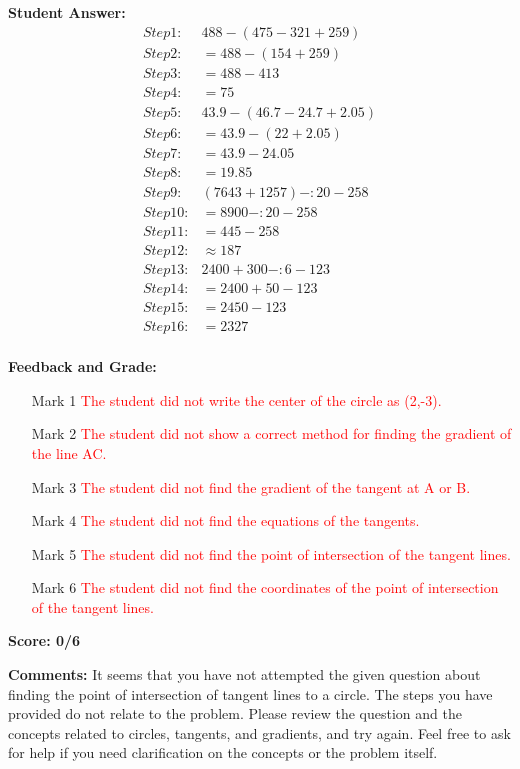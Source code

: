 \documentclass{article}
\begin{document}
\textbf{Student Answer:}
\begin{align*}
Step 1: & 488-(475-321+259) \\
Step 2: & =488-(154+259) \\
Step 3: & =488-413 \\
Step 4: & =75 \\
Step 5: & 43.9-(46.7-24.7+2.05) \\
Step 6: & =43.9-(22+2.05) \\
Step 7: & =43.9-24.05 \\
Step 8: & =19.85 \\
Step 9: & (7643+1257)-:20-258 \\
Step 10: & =8900-:20-258 \\
Step 11: & =445-258 \\
Step 12: & \approx 187 \\
Step 13: & 2400+300-:6-123 \\
Step 14: & =2400+50-123 \\
Step 15: & =2450-123 \\
Step 16: & =2327 \\
\end{align*}

\textbf{Feedback and Grade:}
\begin{itemize}
\item[Mark 1] \textcolor{red}{The student did not write the center of the circle as (2,-3).}
\item[Mark 2] \textcolor{red}{The student did not show a correct method for finding the gradient of the line AC.}
\item[Mark 3] \textcolor{red}{The student did not find the gradient of the tangent at A or B.}
\item[Mark 4] \textcolor{red}{The student did not find the equations of the tangents.}
\item[Mark 5] \textcolor{red}{The student did not find the point of intersection of the tangent lines.}
\item[Mark 6] \textcolor{red}{The student did not find the coordinates of the point of intersection of the tangent lines.}
\end{itemize}

\textbf{Score: 0/6}

\textbf{Comments:} It seems that you have not attempted the given question about finding the point of intersection of tangent lines to a circle. The steps you have provided do not relate to the problem. Please review the question and the concepts related to circles, tangents, and gradients, and try again. Feel free to ask for help if you need clarification on the concepts or the problem itself.
\end{document}

